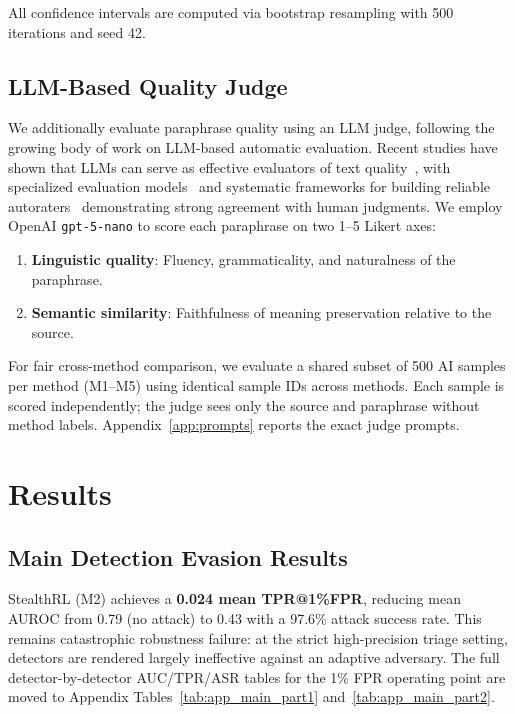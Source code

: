 \documentclass[11pt]{article}
\begin{document}
All confidence intervals are computed via bootstrap resampling with 500 iterations and seed 42.

\subsection{LLM-Based Quality Judge}

We additionally evaluate paraphrase quality using an LLM judge, following the growing body of work on LLM-based automatic evaluation. Recent studies have shown that LLMs can serve as effective evaluators of text quality~\cite{fu2023gptscore}, with specialized evaluation models~\cite{kim2024prometheus2} and systematic frameworks for building reliable autoraters~\cite{vu2024foundationalautoraters} demonstrating strong agreement with human judgments. We employ OpenAI \texttt{gpt-5-nano} to score each paraphrase on two 1--5 Likert axes:
\begin{enumerate}[leftmargin=*,itemsep=2pt]
  \item \textbf{Linguistic quality}: Fluency, grammaticality, and naturalness of the paraphrase.
  \item \textbf{Semantic similarity}: Faithfulness of meaning preservation relative to the source.
\end{enumerate}

For fair cross-method comparison, we evaluate a shared subset of 500 AI samples per method (M1--M5) using identical sample IDs across methods. Each sample is scored independently; the judge sees only the source and paraphrase without method labels. Appendix~\ref{app:prompts} reports the exact judge prompts.

\section{Results}
\label{sec:results}

\subsection{Main Detection Evasion Results}

StealthRL (M2) achieves a \textbf{0.024 mean TPR@1\%FPR}, reducing mean AUROC from 0.79 (no attack) to 0.43 with a 97.6\% attack success rate. This remains catastrophic robustness failure: at the strict high-precision triage setting, detectors are rendered largely ineffective against an adaptive adversary. The full detector-by-detector AUC/TPR/ASR tables for the 1\% FPR operating point are moved to Appendix Tables~\ref{tab:app_main_part1} and~\ref{tab:app_main_part2}.
\end{document}
